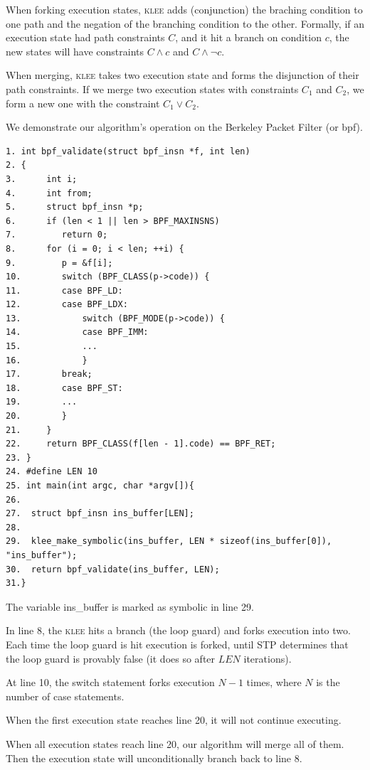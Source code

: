 \documentclass[12pt,a4paper]{article}
\newcommand{\klee}{\textsc{klee }}
\begin{document}
When forking execution states, \klee adds (conjunction) the braching condition to one path and the negation of the branching condition to the other. Formally, if an execution state had path constraints $C$, and it hit a branch on condition $c$, the new states will have constraints $C \wedge c$ and $C \wedge \neg c$.

When merging, \klee takes two execution state and forms the disjunction of their path constraints. If we merge two execution states with constraints $C_1$ and $C_2$, we form a new one with the constraint $C_1 \vee C_2$.

We demonstrate our algorithm's operation on the Berkeley Packet Filter (or bpf).

\linespread{0}

\begin{verbatim}
1. int bpf_validate(struct bpf_insn *f, int len)
2. {
3.      int i;
4.      int from;
5.      struct bpf_insn *p;
6.      if (len < 1 || len > BPF_MAXINSNS)
7.         return 0;
8.      for (i = 0; i < len; ++i) {
9.         p = &f[i];
10.        switch (BPF_CLASS(p->code)) {
11.        case BPF_LD:
12.        case BPF_LDX:
13.            switch (BPF_MODE(p->code)) {
14.            case BPF_IMM:
15.            ...
16.            }
17.        break;
18.        case BPF_ST:
19.        ...
20.        }
21.     }
22.     return BPF_CLASS(f[len - 1].code) == BPF_RET;
23. }
24. #define LEN 10 
25. int main(int argc, char *argv[]){  
26.
27.  struct bpf_insn ins_buffer[LEN];
28.
29.  klee_make_symbolic(ins_buffer, LEN * sizeof(ins_buffer[0]), "ins_buffer");
30.  return bpf_validate(ins_buffer, LEN);
31.}
\end{verbatim}

\begin{enumerate*}
\item The variable ins\_buffer is marked as symbolic in line 29.
\item In line 8, the \klee hits a branch (the loop guard) and forks execution into two. Each time the loop guard is hit execution is forked, until STP determines that the loop guard is provably false (it does so after $LEN$ iterations).
\item At line 10, the switch statement forks execution $N-1$ times, where $N$ is the number of case statements.
\item When the first execution state reaches line 20, it will not continue executing.
\item When all execution states reach line 20, our algorithm will merge all of them. Then the execution state will unconditionally branch back to line 8.
\end{enumerate*}
\end{document}
